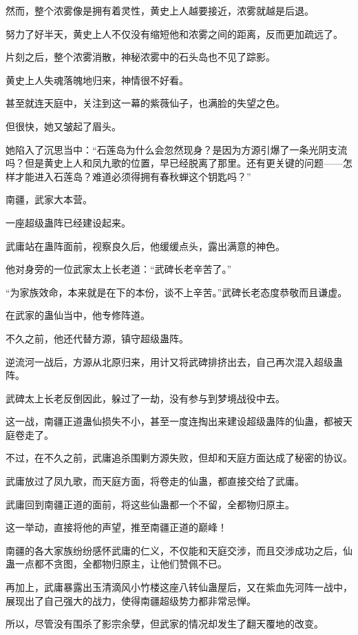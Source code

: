 \begin{this_body}
然而，整个浓雾像是拥有着灵性，黄史上人越要接近，浓雾就越是后退。

努力了好半天，黄史上人不仅没有缩短他和浓雾之间的距离，反而更加疏远了。

片刻之后，整个浓雾消散，神秘浓雾中的石头岛也不见了踪影。

黄史上人失魂落魄地归来，神情很不好看。

甚至就连天庭中，关注到这一幕的紫薇仙子，也满脸的失望之色。

但很快，她又皱起了眉头。

她陷入了沉思当中：“石莲岛为什么会忽然现身？是因为方源引爆了一条光阴支流吗？但是黄史上人和凤九歌的位置，早已经脱离了那里。还有更关键的问题——怎样才能进入石莲岛？难道必须得拥有春秋蝉这个钥匙吗？”

南疆，武家大本营。

一座超级蛊阵已经建设起来。

武庸站在蛊阵面前，视察良久后，他缓缓点头，露出满意的神色。

他对身旁的一位武家太上长老道：“武碑长老辛苦了。”

“为家族效命，本来就是在下的本份，谈不上辛苦。”武碑长老态度恭敬而且谦虚。

在武家的蛊仙当中，他专修阵道。

不久之前，他还代替方源，镇守超级蛊阵。

逆流河一战后，方源从北原归来，用计又将武碑排挤出去，自己再次混入超级蛊阵。

武碑太上长老反倒因此，躲过了一劫，没有参与到梦境战役中去。

这一战，南疆正道蛊仙损失不小，甚至一度连掏出来建设超级蛊阵的仙蛊，都被天庭卷走了。

不过，在不久之前，武庸追杀围剿方源失败，但却和天庭方面达成了秘密的协议。

武庸放过了凤九歌，而天庭方面，将卷走的仙蛊，都直接交给了武庸。

武庸回到南疆正道的面前，将这些仙蛊都一个不留，全都物归原主。

这一举动，直接将他的声望，推至南疆正道的巅峰！

南疆的各大家族纷纷感怀武庸的仁义，不仅能和天庭交涉，而且交涉成功之后，仙蛊一点都不贪图，全都物归原主，让他们赞佩不已。

再加上，武庸暴露出玉清滴风小竹楼这座八转仙蛊屋后，又在紫血先河阵一战中，展现出了自己强大的战力，使得南疆超级势力都非常忌惮。

所以，尽管没有围杀了影宗余孽，但武家的情况却发生了翻天覆地的改变。


\end{this_body}
